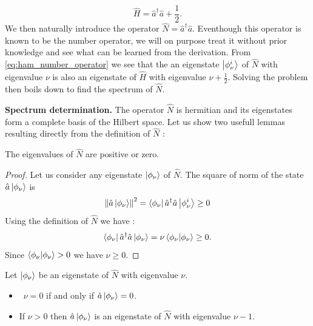 \begin{equation}
    \label{eq:ham_number_operator}
    \hat{H}=\hat{a}^\dagger\hat{a}+\frac{1}{2}.
\end{equation}
We then naturally introduce the operator $\hat{N}=\hat{a}^\dagger\hat{a}$. Eventhough this operator 
is known to be the number operator, we will on purpose treat it without prior knowledge and see what can be learned from the derivation.
From \autoref{eq:ham_number_operator} we see that the an eigenstate $\ket{\phi^i_\nu}$ of $\hat{N}$ with eigenvalue $\nu$ is also
an eigenstate of $\hat{H}$ with eigenvalue $\nu+\frac{1}{2}$. Solving the problem then boils down to find the spectrum of $\hat{N}$.

\textbf{Spectrum determination.} The operator $\hat{N}$ is hermitian and its eigenstates form a complete basis of the Hilbert space. Let us 
show two usefull lemmas resulting directly from the definition of $\hat{N}$ :

\begin{lemma}
    The eigenvalues of $\hat{N}$ are positive or zero.
\end{lemma}

\begin{proof}
    Let us consider any eigenstate $\ket{\phi_\nu}$ of $\hat{N}$. The square of norm of the state $\hat{a}\ket{\phi_\nu}$ is 
    \begin{equation}
            \norm{\hat{a}\ket{\phi_\nu}}^2=\bra{\phi_\nu}\hat{a}^\dagger\hat{a}\ket{\phi^i_\nu} \geq 0   
\end{equation}
    Using the definition of $\hat{N}$ we have :
    \begin{equation}
        \label{eq:positive_eigenvalue}
        \bra{\phi_\nu}\hat{a}^\dagger\hat{a}\ket{\phi_\nu}=\nu\bra{\phi_\nu}\ket{\phi_\nu} \geq 0.
    \end{equation}
Since $\bra{\phi_\nu}\ket{\phi_\nu}>0$ we have $\nu\geq 0$.
\end{proof}

\begin{lemma}
    Let $\ket{\phi_\nu}$ be an eigenstate of $\hat{N}$ with eigenvalue $\nu$.
    \begin{itemize}
        \item \ $\nu=0$ if and only if $\hat{a}\ket{\phi_\nu}=0$.
        \item If $\nu>0$ then $\hat{a}\ket{\phi_\nu}$ is an eigenstate of $\hat{N}$ with eigenvalue $\nu-1$.
    \end{itemize}
\end{lemma}

